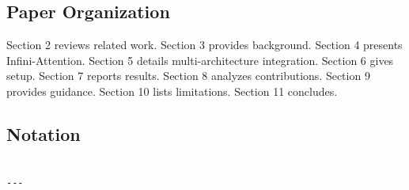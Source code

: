 \subsection{Paper Organization}

Section 2 reviews related work. Section 3 provides background. Section 4 
presents Infini-Attention. Section 5 details multi-architecture integration. 
Section 6 gives setup. Section 7 reports results. Section 8 analyzes 
contributions. Section 9 provides guidance. Section 10 lists limitations. 
Section 11 concludes.



\subsection{Notation}

\begin{lstlisting}

---
\end{lstlisting}